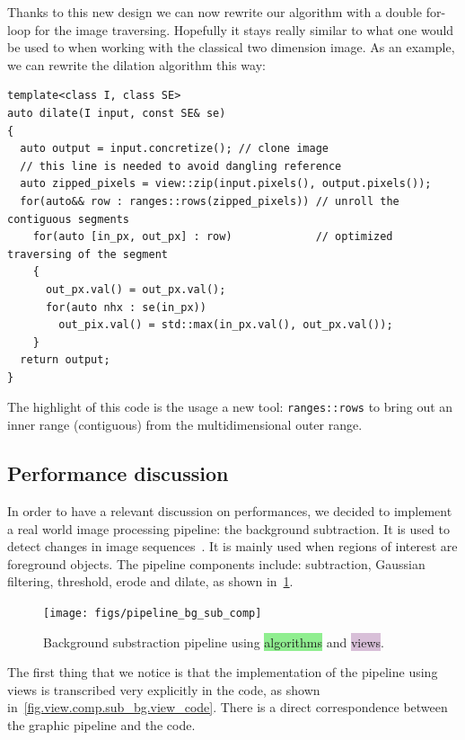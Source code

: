 Thanks to this new design we can now rewrite our algorithm with a double for-loop for the image traversing. Hopefully it
stays really similar to what one would be used to when working with the classical two dimension image. As an example, we
can rewrite the dilation algorithm this way:
\begin{verbatim}
template<class I, class SE>
auto dilate(I input, const SE& se)
{
  auto output = input.concretize(); // clone image
  // this line is needed to avoid dangling reference
  auto zipped_pixels = view::zip(input.pixels(), output.pixels());
  for(auto&& row : ranges::rows(zipped_pixels)) // unroll the contiguous segments
    for(auto [in_px, out_px] : row)             // optimized traversing of the segment
    {
      out_px.val() = out_px.val();
      for(auto nhx : se(in_px))
        out_pix.val() = std::max(in_px.val(), out_px.val());
    }
  return output;
}
\end{verbatim}

The highlight of this code is the usage a new tool: \texttt{ranges::rows} to bring out an inner range (contiguous) from
the multidimensional outer range.

\subsection{Performance discussion}

In order to have a relevant discussion on performances, we decided to implement a real world image processing pipeline:
the background subtraction. It is used to detect changes in image sequences~\parencite{opencv.bg_sub}. It is mainly used
when regions of interest are foreground objects. The pipeline components include: subtraction, Gaussian filtering,
threshold, erode and dilate, as shown in~\ref{fig.view.comp.sub_bg}.

\begin{figure}[htbp]
  \centering
  \texttt{[image: figs/pipeline\_bg\_sub\_comp]}
  \caption{Background substraction pipeline using \colorbox{lightgreen}{algorithms} and
    \colorbox{thistle}{views}.}
  \label{fig.view.comp.sub_bg}
\end{figure}

The first thing that we notice is that the implementation of the pipeline using views is transcribed very explicitly in
the code, as shown in~\cref{fig.view.comp.sub_bg.view_code}. There is a direct correspondence between the graphic
pipeline and the code.

